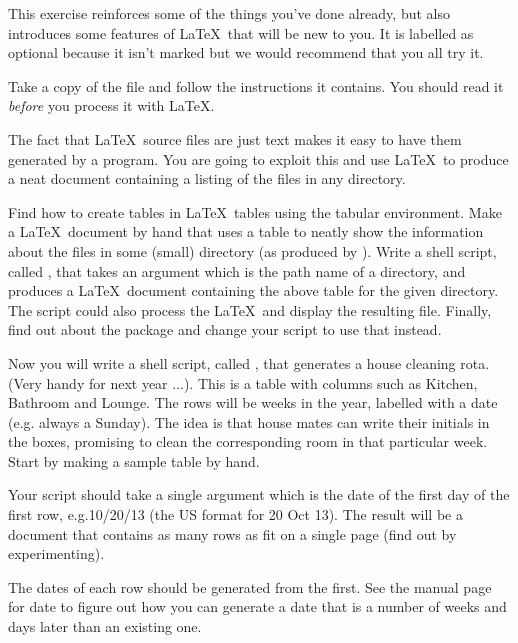 \begin{refsection}
This exercise reinforces some of the things you've done already, but
also introduces some features of \LaTeX\ that will be new to you. It is labelled as optional because it isn't marked but we would recommend that you all try it.

Take a copy of the file
 and follow the
instructions it contains. You should read it \emph{before} you process
it with \LaTeX.

The fact that \LaTeX\ source files are just text makes it easy to have them generated by a program. You are going to exploit this and use \LaTeX\ to produce a neat document containing a listing of the files in any directory.

Find how to create tables in \LaTeX\ tables using the tabular
environment.  Make a \LaTeX\ document by hand that uses a table to
neatly show the information about the files in some (small) directory
(as produced by ).  Write a shell script, called
, that takes an argument which is the path name of a
directory, and produces a \LaTeX\ document containing the above table
for the given directory. The script could also process the \LaTeX\ and
display the resulting  file.  Finally, find out about the 
package and change your script to use that instead.

\begin{demonote}
  \small
  
\end{demonote}

Now you will write a shell script, called , that generates a house cleaning rota. (Very handy for next year ...). This is a table with columns such as Kitchen, Bathroom and Lounge. The rows will be weeks in the year, labelled with a date (e.g. always a Sunday). The idea is that house mates can write their initials in the boxes, promising to clean the corresponding room in that particular week. Start by making a sample table by hand.

Your script should take a single argument which is the date of the first day of the first row, e.g.10/20/13 (the US format for 20 Oct 13). The result will be a document that contains as many rows as fit on a single page (find out by experimenting).

The dates of each row should be generated from the first. See the manual page for date to figure out how you can generate a date that is a number of weeks and days later than an existing one.


\end{refsection}
